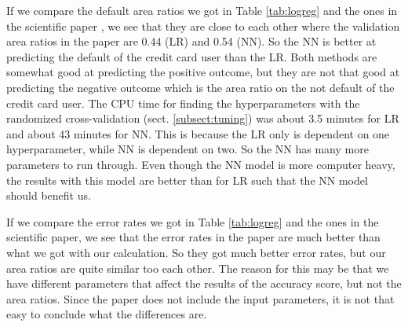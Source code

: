 \documentclass[12pt,a4paper,english]{article}
\begin{document}
If we compare the default area ratios we got in Table \ref{tab:logreg} and the ones in the scientific paper \cite{origarticle}, we see that they are close to each other where the validation area ratios in the paper are 0.44 (LR) and 0.54 (NN). So the NN is better at predicting the default of the credit card user than the LR. Both methods are somewhat good at predicting the positive outcome, but they are not that good at predicting the negative outcome which is the area ratio on the not default of the credit card user. The CPU time for finding the hyperparameters with the randomized cross-validation (sect. \ref{subsect:tuning}) was about 3.5 minutes for LR and about 43 minutes for NN. This is because the LR only is dependent on one hyperparameter, while NN is dependent on two. So the NN has many more parameters to run through. Even though the NN model is more computer heavy, the results with this model are better than for LR such that the NN model should benefit us. 

If we compare the error rates we got in Table \ref{tab:logreg} and the ones in the scientific paper, we see that the error rates in the paper are much better than what we got with our calculation. So they got much better error rates, but our area ratios are quite similar too each other. The reason for this may be that we have different parameters that affect the results of the accuracy score, but not the area ratios. Since the paper does not include the input parameters, it is not that easy to conclude what the differences are.
\end{document}

